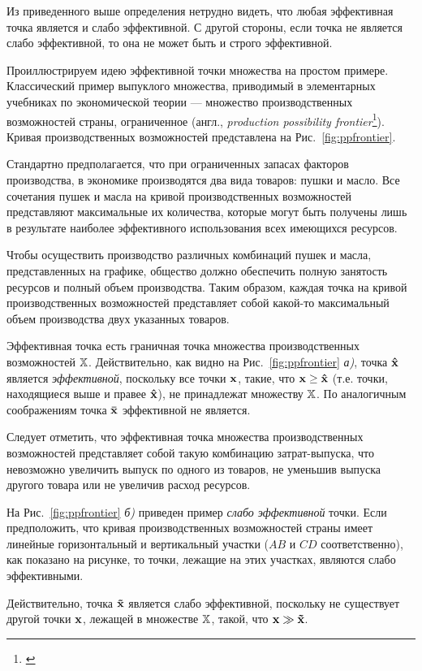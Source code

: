 Из приведенного выше определения нетрудно видеть, что любая
эффективная точка является и слабо эффективной. С другой стороны,
если точка не является слабо эффективной, то она не может быть и
строго эффективной.

\begin{comm}
Проиллюстрируем идею эффективной точки множества на простом примере.
Классический пример выпуклого множества, приводимый в элементарных
учебниках по экономической теории --- множество производственных
возможностей страны, ограниченное  (англ., \emph{production possibility
frontier}\footnote{\cite{McConnell:1996}}). Кривая производственных
возможностей представлена на Рис.~\ref{fig:ppfrontier}.

Стандартно предполагается, что при ограниченных запасах факторов
производства, в экономике производятся два вида товаров: пушки и
масло. Все сочетания пушек и масла на кривой производственных
возможностей представляют максимальные их количества, которые могут
быть получены лишь в результате наиболее эффективного использования
всех имеющихся ресурсов.

Чтобы осуществить производство различных комбинаций пушек и масла,
представленных на графике, общество должно обеспечить полную
занятость ресурсов и полный объем производства. Таким образом,
каждая точка на кривой производственных возможностей представляет
собой какой-то максимальный объем производства двух указанных
товаров.



Эффективная точка есть граничная точка множества производственных
возможностей $\mathbb{X}$. Действительно, как видно на
Рис.~\ref{fig:ppfrontier} \emph{а)}, точка $\mathbf{\hat x}$ является
\emph{эффективной}, поскольку все точки $\mathbf{x}$, такие, что $\mathbf{x}
\geq \mathbf{\hat x}$ (т.\/е. точки, находящиеся выше и правее $\mathbf{\hat
x}$), не принадлежат множеству $\mathbb{X}$. По аналогичным соображениям
точка $\mathbf{\bar x}$ эффективной не является.

Следует отметить, что эффективная точка множества производственных
возможностей представляет собой такую комбинацию затрат-выпуска, что
невозможно увеличить выпуск по одного из товаров, не уменьшив
выпуска другого товара или не увеличив расход ресурсов.

На Рис.~\ref{fig:ppfrontier} \emph{б)} приведен пример \emph{слабо
эффективной} точки. Если предположить, что кривая производственных
возможностей страны имеет линейные горизонтальный и вертикальный
участки ($AB$ и $CD$ соответственно), как показано на рисунке, то
точки, лежащие на этих участках, являются слабо эффективными.

Действительно, точка $\mathbf{\tilde x}$ является слабо эффективной,
поскольку не существует другой точки $\mathbf{x}$, лежащей в множестве
$\mathbb{X}$, такой, что $\mathbf{x} \gg \mathbf{\tilde x}$.

\end{comm}


